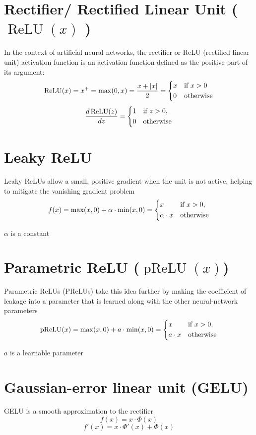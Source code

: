 \section{Rectifier/ Rectified Linear Unit ( $\operatorname{ReLU}(x)$ ) \cite{wiki-Rectifier,dnn-1}}\label{ReLU}
In the context of artificial neural networks, the rectifier or ReLU (rectified linear unit) activation function is an activation function defined as the positive part of its argument:
\[
    \operatorname{ReLU}(x)=x^{+}=\max(0,x)={\dfrac {x+\left| x \right|}{2}}
    ={\begin{dcases}x&{\text{if }}x>0\\
    0&{\text{otherwise}}\end{dcases}}
\]
\[
    \dfrac{d\operatorname{ReLU}(z)}{dz}={\begin{dcases}1&{\text{if }}z>0,\\0&{\text{otherwise}}\end{dcases}}
\]

\section{Leaky ReLU \cite{wiki-Rectifier}}\label{Leaky ReLU}
Leaky ReLUs allow a small, positive gradient when the unit is not active, helping to mitigate the vanishing gradient problem
\[
    f(x)
    = \max(x,0) + \alpha\cdot\min(x,0)
    ={\begin{dcases}x&{\text{if }}x>0,\\\alpha\cdot x&{\text{otherwise}}\end{dcases}} 
\]

$\alpha$ is a constant

\section{Parametric ReLU ($\operatorname{pReLU}(x)$) \cite{wiki-Rectifier,dnn-1}} \label{Parametric ReLU (PReLU)}
Parametric ReLUs (PReLUs) take this idea further by making the coefficient of leakage into a parameter that is learned along with the other neural-network parameters
\[
    \operatorname{pReLU}(x)
    = \max(x,0) + a\cdot\min(x,0)
    ={\begin{dcases}x&{\text{if }}x>0,\\a\cdot x&{\text{otherwise}}\end{dcases}}
\]

$a$ is a learnable parameter

\section{Gaussian-error linear unit (GELU)}\label{Gaussian-error linear unit (GELU)}
GELU is a smooth approximation to the rectifier
\[
    f(x)=x\cdot \Phi (x)
\]
\[
    f'(x)=x\cdot \Phi '(x)+\Phi (x)
\]


